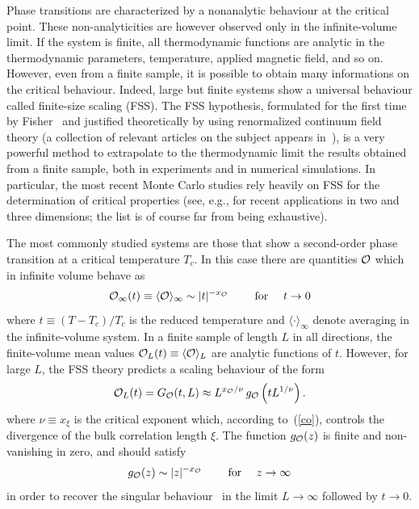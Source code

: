 \documentclass[12pt]{article}
\begin{document}
Phase transitions are characterized by a nonanalytic behaviour at the 
critical point. These non-analyticities are however observed only in the 
infinite-volume limit. If the system is finite, all thermodynamic functions
are analytic in the thermodynamic parameters, temperature, applied magnetic 
field, and so on. However, even from a finite sample, it is possible to 
obtain many informations on the critical behaviour.
Indeed, large but finite systems show a universal behaviour called 
finite-size scaling (FSS). The FSS hypothesis, formulated for the
first time by Fisher~\cite{Fisher71,Fisher72,Imry} and justified 
theoretically by using renormalized continuum field theory 
\cite{Brezin82,Brezin85} (a collection of
relevant articles on the subject appears in~\cite{Cardy88}), is a very
powerful method to extrapolate  to the thermodynamic limit
the results obtained from a finite sample, both in experiments and in 
numerical simulations. In particular, the most recent Monte Carlo 
studies rely heavily on FSS for the determination of critical 
properties (see, e.g., 
\cite{LWW-91,Hasenbusch-93,BK-93,BLH-95,Caracciolo95,Caracciolo95b,%
Salas:1997bh,Ferreira:1998tq,HPV-99,BFMMPR-99} 
for recent applications in two and three dimensions; 
the list is of course far from being exhaustive).

The most commonly studied systems are those that show a second-order 
phase transition at a critical temperature $T_c$.
In this case there are quantities ${\cal O}$ which in infinite volume behave as 
\begin{equation}
  {\cal O}_\infty(t)\equiv \langle {\cal O} \rangle_\infty  \sim |t|^{-x_{\cal O}} 
\qquad \hbox{ for }\quad t \to 0
 \label{coinf}
\end{equation}
where $t \equiv (T - T_c)/T_c$ is the reduced temperature and $\langle
\cdot \rangle_\infty$ denote averaging in the infinite-volume system.
In a finite sample of length $L$ in all directions, the 
finite-volume mean values 
${\cal O}_L(t) \equiv \langle {\cal O} \rangle_L$ are analytic functions of $t$. 
However, for large $L$, the FSS theory predicts a scaling behaviour of the form
\begin{equation}
 {\cal O}_L(t) = G_{\cal O}(t, L) \approx L^{x_{\cal O} / \nu}\, g_{\cal O} \left (t
   L^{1/ \nu} \right). 
\label{co}
\end{equation}
where $\nu \equiv x_\xi$ is the critical exponent which, according
to~(\ref{co}), controls the divergence of the bulk correlation length $\xi$.
The function $g_{\cal O}(z)$ is finite and non-vanishing in zero, and should
satisfy
\begin{equation}
   g_{\cal O}(z) \sim  |z|^{-x_{\cal O}}  \qquad \hbox{ for }\quad z \to \infty
\end{equation}
in order to recover the singular behaviour~ in the limit
$L\rightarrow\infty$ followed by $t\to 0$.
\end{document}
